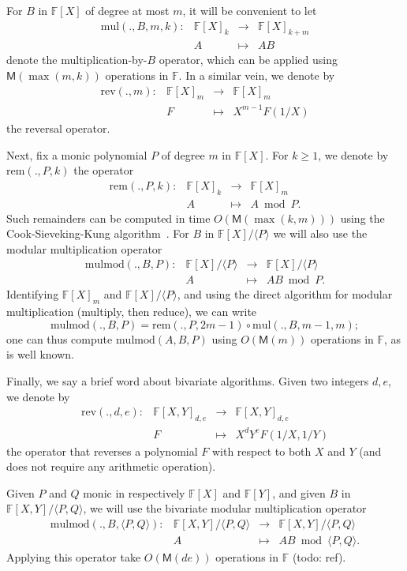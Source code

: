 \documentclass[12pt]{article}
\def\M {\ensuremath{\mathsf{M}}}
\def\F {\ensuremath{\mathbb{F}}}
\def\mul {\ensuremath{\mathrm{mul}}}
\def\rem {\ensuremath{\mathrm{rem}}}
\def\mulmod {\ensuremath{\mathrm{mulmod}}}
\def\rev {\ensuremath{\mathrm{rev}}}
\begin{document}
For $B$ in $\F[X]$ of degree at most $m$, it will be convenient to let
$$
\begin{array}{cccc}
\mul(.,B,m,k): &\F[X]_k& \to &\F[X]_{k+m}\\
& A & \mapsto & AB
\end{array}$$ 
denote the multiplication-by-$B$ operator, which can be applied using
$\M(\max(m,k))$ operations in $\F$. In a similar vein, we denote by
$$
\begin{array}{cccc}
\rev(.,m): &\F[X]_m &\to& \F[X]_m  \\
& F & \mapsto & X^{m-1} F(1/X)
\end{array}$$ the reversal operator. 

Next, fix a monic polynomial $P$ of degree $m$ in $\F[X]$. For $k \ge 1$, we denote by
$\rem(.,P,k)$ the operator
$$
\begin{array}{cccc}
\rem(.,P,k): &\F[X]_k& \to &\F[X]_{m}\\
& A & \mapsto & A \bmod P.
\end{array}$$ 
Such remainders can be computed in time $O(\M(\max(k,m)))$ using the
Cook-Sieveking-Kung algorithm~\cite[Chapter~9]{vzGG}. For $B$
in $\F[X]/\langle P \rangle$ we will also use the modular multiplication
operator
$$\begin{array}{cccc} \mulmod(.,B,P): & \F[X]/\langle P \rangle & \to
  & \F[X]/\langle P \rangle\\ & A & \mapsto & AB \bmod P.
\end{array}$$ 
Identifying $\F[X]_m$ and $\F[X]/\langle P \rangle$, and using the
direct algorithm for modular multiplication (multiply, then reduce),
we can write $$\mulmod(.,B,P) = \rem(.,P,2m-1) \circ \mul(.,B,m-1,m);$$
one can thus compute $\mulmod(A,B,P)$ using $O(\M(m))$ operations in
$\F$, as is well known.

Finally, we say a brief word about bivariate algorithms.  Given two
integers $d,e$, we denote by
$$
\begin{array}{cccc}
\rev(.,d,e): &\F[X,Y]_{d,e} &\to& \F[X,Y]_{d,e}  \\
& F & \mapsto & X^d Y^e F(1/X,1/Y)
\end{array}$$
the operator that reverses a polynomial $F$ with respect to both $X$
and $Y$ (and does not require any arithmetic operation).

Given $P$ and $Q$ monic in respectively $\F[X]$ and $\F[Y]$, 
and given $B$ in $\F[X,Y]/\langle P,Q\rangle$, we will use the
bivariate modular multiplication operator
$$\begin{array}{cccc} \mulmod(.,B,\langle P,Q \rangle): & \F[X,Y]/\langle P,Q \rangle & \to
  & \F[X,Y]/\langle P,Q \rangle\\ & A & \mapsto & AB \bmod \langle P, Q \rangle.
\end{array}$$ 
Applying this operator take $O(\M(de))$ operations in $\F$ (todo: ref).
\end{document}
